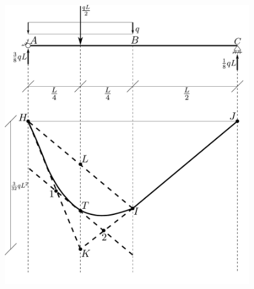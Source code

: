 \renewcommand{\thefigure}{14~-~1}
\begin{figure}[ht]
\centering
\includegraphics[width=0.95\textwidth]{Immagini/Parte_14/Figura14_1/figura14_1.pdf}
\caption{}
\label{figura14-1}
\end{figure}
